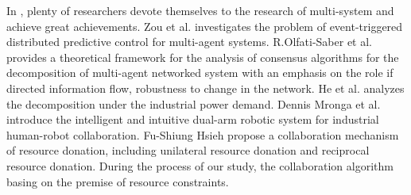In \cite{Jennings91cooperationin,ferber1999multi,damavandi2016modeling,hanzo2009near}, plenty of researchers devote themselves to the research of multi-system and achieve great achievements.
Zou et al.\cite{zou2016event} investigates  the problem of event-triggered distributed predictive control for multi-agent systems.
R.Olfati-Saber et al.\cite{4118472} provides a theoretical framework for the analysis of consensus algorithms for the decomposition of multi-agent networked system with an emphasis on the role if directed information flow, robustness to change in the network.
He et al.\cite{he2008decomposition} analyzes the decomposition under the industrial power demand.
Dennis Mronga et al.\cite{deGeaFernandez2017} introduce the intelligent and intuitive dual-arm robotic system for industrial human-robot collaboration.
Fu-Shiung Hsieh \cite{DBLP:journals/eaai/Hsieh09} propose a collaboration mechanism of resource donation, including unilateral resource donation and reciprocal resource donation. During the process of our study, the collaboration algorithm basing on the premise of resource constraints.

